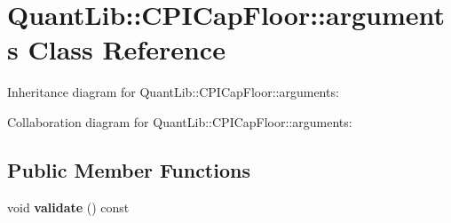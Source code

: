 \section{Quant\+Lib\+:\+:C\+P\+I\+Cap\+Floor\+:\+:arguments Class Reference}
\label{class_quant_lib_1_1_c_p_i_cap_floor_1_1arguments}


Inheritance diagram for Quant\+Lib\+:\+:C\+P\+I\+Cap\+Floor\+:\+:arguments\+:


Collaboration diagram for Quant\+Lib\+:\+:C\+P\+I\+Cap\+Floor\+:\+:arguments\+:
\subsection*{Public Member Functions}
\begin{DoxyCompactItemize}
\item 
void {\bfseries validate} () const \label{class_quant_lib_1_1_c_p_i_cap_floor_1_1arguments_ac88716a1cfc551ced09053ffd8554182}

\end{DoxyCompactItemize}
